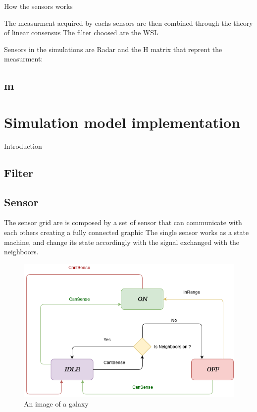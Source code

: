 \documentclass{article}
\begin{document}
\begin{multicols}{2}
            {How the sensors works}

            The measurment acquired by eachs sensors are then combined through the theory of linear consensus
            The filter choosed are the WSL
            
            Sensors in the simulations are Radar and the H matrix that reprent the measurment:

        \subsection*{m}
    
    \section*{Simulation model implementation}
    Introduction
    \subsection*{Filter}
    \subsection*{Sensor}
    The sensor grid are is composed by a set of sensor that can communicate with each others creating a fully connected graphic
    The single sensor works as a state machine, and change its state accordingly with the signal exchanged with the neighboors.
    \begin{figure}[htp]
        \centering
        \includegraphics[scale=0.1]{UntitledDiagram.png}
        \caption{An image of a galaxy}
        \label{fig:galaxy}
    \end{figure}

\end{multicols}
\end{document}
